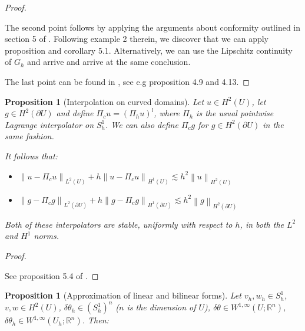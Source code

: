 \documentclass[english,a4paper,9pt,oneside]{scrbook}	%
\theoremstyle{break}
\newtheorem{prop}[equation]{Proposition}
\newenvironment{mproof}[1][\proofname]{%
  \begin{proof}[#1]$ $\par\nobreak\ignorespaces
}{%
  \end{proof}
}
\renewcommand*{\proofname}{Proof}
\theoremstyle{remark}
\newcommand{\mR}{\mathbb{R}}
\newcommand{\norm}[1]{\left\lVert#1\right\rVert}
\newcommand{\te}{\theta}
\begin{document}
\begin{appendices}
\begin{mproof}
The second point follows by applying the arguments about conformity outlined in section 5 of \cite{bernardi}. Following example 2 therein, we discover that we can apply proposition and corollary 5.1. Alternatively, we can use the Lipschitz continuity of $G_h$ and arrive and arrive at the same conclusion.

The last point can be found in \cite{elliott}, see e.g proposition 4.9 and 4.13.
%
%
%
%
\end{mproof}

\begin{prop}[Interpolation on curved domains]
\label{prop:interp_curv}
Let $u \in H^2(U)$, let $g \in H^2(\partial U)$ and define $\Pi_c u = (\Pi_h u )^l$, where $\Pi_h$ is the usual pointwise Lagrange interpolator on $S^1_h$.
We can also define $\Pi_c g $ for $g \in H^2(\partial U)$ in the same fashion. 

It follows that:

\begin{itemize}
	\item $\norm{u-\Pi_c u}_{L^2(U)} + h \norm{u-\Pi_c u}_{H^1(U)}\lesssim h^2\norm{u}_{H^2(U)}$
	\item $\norm{g-\Pi_c g}_{L^2(\partial U)} + h \norm{g-\Pi_c g}_{H^1(\partial U)}\lesssim h^2\norm{g}_{H^2(\partial U)}$
\end{itemize}
Both of these interpolators are stable, uniformly with respect to $h$, in both the $L^2$ and $H^1$ norms.
\end{prop}

\begin{mproof}
See proposition 5.4 of \cite{elliott}.
\end{mproof}

\begin{prop}[Approximation of linear and bilinear forms]
\label{prop:lin_appr}
Let $v_h, w_h \in S^1_h$, $v,w \in H^2(U)$, $\delta \te_h \in (S^1_h)^n$ ($n$ is the dimension of $U$), $\delta \te \in W^{1,\infty}(U;\mR^n)$, $\delta \te_h \in W^{1,\infty}(U_h;\mR^n)$. Then:


\end{prop}
\end{appendices}
\end{document}
